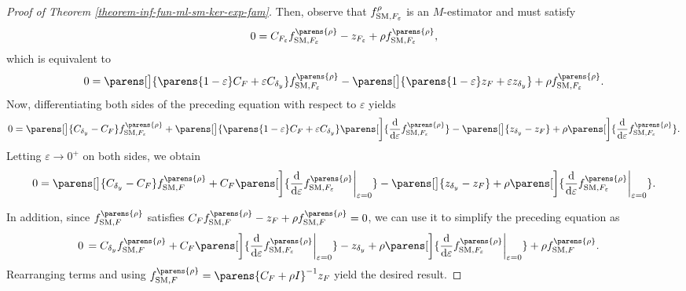 \begin{proof}[Proof of Theorem \ref{theorem-inf-fun-ml-sm-ker-exp-fam}]
	Then, observe that $f_{\mathrm{SM}, F_{\varepsilon}}^{\rho}$ is an $M$-estimator and must satisfy 
	\begin{align*}
		0 = C_{F_{\varepsilon}} f_{\SM, F_{\varepsilon}}^{\parens{\rho}} - z_{F_{\varepsilon}} + \rho f_{\SM, F_{\varepsilon}}^{\parens{\rho}}, 
	\end{align*}
	which is equivalent to 
	\begin{align*}
		0 = \parens[\big]{\parens{1 - \varepsilon} C_{F} + \varepsilon C_{\delta_y}} f_{\SM, F_{\varepsilon}}^{\parens{\rho}} - \parens[\big]{\parens{1 - \varepsilon} z_{F} + \varepsilon z_{\delta_y}} + \rho f_{\SM, F_{\varepsilon}}^{\parens{\rho}}. \label{sm-foc}
	\end{align*}
	Now, differentiating both sides of the preceding equation with respect to $\varepsilon$ yields 
	\begin{align*}
		0 = \parens[\big]{ C_{\delta_y} - C_{F}} f_{\SM, F_{\varepsilon}}^{\parens{\rho}} + \parens[\big]{\parens{1 - \varepsilon} C_{F} + \varepsilon C_{\delta_y}} \parens[\bigg]{\frac{\diff}{\diff \varepsilon} f_{\SM, F_{\varepsilon}}^{\parens{\rho}}} - \parens[\big]{ z_{\delta_y} - z_{F} } + \rho \parens[\bigg]{\frac{\diff}{\diff \varepsilon} f_{\SM, F_{\varepsilon}}^{\parens{\rho}}}. 
	\end{align*}
	Letting $\varepsilon \to 0^+$ on both sides, we obtain 
	\begin{align*}
		0 = \parens[\big]{ C_{\delta_y} - C_{F}} f_{\SM, F}^{\parens{\rho}} + C_{F} \parens[\bigg]{\frac{\diff}{\diff \varepsilon} f_{\SM, F_{\varepsilon}}^{\parens{\rho}} \bigg\vert_{\varepsilon=0}} - \parens[\big]{ z_{\delta_y} - z_{F} } + \rho \parens[\bigg]{\frac{\diff}{\diff \varepsilon} f_{\SM, F_{\varepsilon}}^{\parens{\rho}} \bigg\vert_{\varepsilon=0}}. 
	\end{align*}
	
	In addition, since $f_{\SM, F}^{\parens{\rho}}$ satisfies $C_F f_{\SM, F}^{\parens{\rho}} - z_F + \rho f_{\SM, F}^{\parens{\rho}} = 0$, we can use it to simplify the preceding equation as 
	\begin{align}
		0 & \, = C_{\delta_y} f_{\SM, F}^{\parens{\rho}} + C_{F} \parens[\bigg]{\frac{\diff}{\diff \varepsilon} f_{\SM, F_{\varepsilon}}^{\parens{\rho}} \bigg \vert_{\varepsilon = 0}} - z_{\delta_y} + \rho \parens[\bigg]{\frac{\diff}{\diff \varepsilon} f_{\SM, F_{\varepsilon}}^{\parens{\rho}} \bigg\vert_{\varepsilon=0}} + \rho f_{\SM, F}^{\parens{\rho}}. 
	\end{align}
	Rearranging terms and using $f_{\SM, F}^{\parens{\rho}} = \parens{C_{F} + \rho I}^{-1} z_{F}$ yield the desired result. 
\end{proof}

